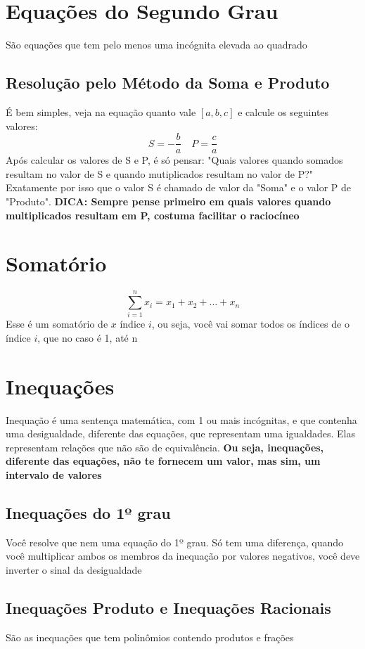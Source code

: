 \documentclass{article}
\begin{document}
\section{Equações do Segundo Grau}
São equações que tem pelo menos uma incógnita elevada ao quadrado
\subsection{Resolução pelo Método da Soma e Produto}
É bem simples, veja na equação quanto vale $[a, b, c]$ e calcule os seguintes valores:
 \[
    S = -\frac{b}{a} \quad P = \frac{c}{a}
\]
Após calcular os valores de S e P, é só pensar: "Quais valores quando somados resultam no valor de S e quando mutiplicados resultam no valor de P?"
\\
Exatamente por isso que o valor S é chamado de valor da "Soma" e o valor P de "Produto". \textbf{DICA: Sempre pense primeiro em quais valores quando multiplicados resultam em P, costuma facilitar o raciocíneo}


\section{Somatório}
\[
\sum_{i=1}^{n} x_i = x_1 + x_2 + \dots + x_n
\]
Esse é um somatório de $x$ índice $i$, ou seja, você vai somar todos os índices de o índice $i$, que no caso é 1, até n

\section{Inequações}
Inequação é uma sentença matemática, com 1 ou mais incógnitas, e que contenha uma desigualdade, diferente das equações, que representam uma igualdades. Elas representam relações que não são de equivalência. \textbf{Ou seja, inequações, diferente das equações, não te fornecem um valor, mas sim, um intervalo de valores}

\subsection{Inequações do 1º grau}
Você resolve que nem uma equação do 1º grau. Só tem uma diferença, quando você multiplicar ambos os membros da inequação por valores negativos, você deve inverter o sinal da desigualdade

\subsection{Inequações Produto e Inequações Racionais}
São as inequações que tem polinômios contendo produtos e frações
\end{document}
